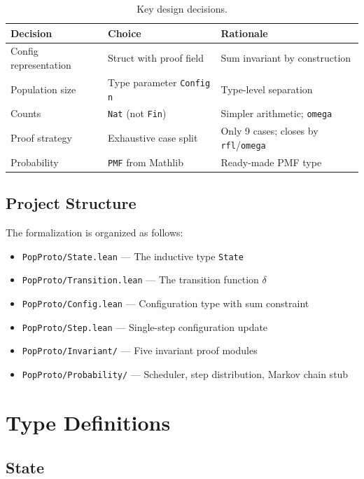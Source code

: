 \documentclass[11pt,a4paper]{article}
\begin{document}
\begin{table}[h]
\centering
\begin{tabular}{lll}
\toprule
\textbf{Decision} & \textbf{Choice} & \textbf{Rationale} \\
\midrule
Config representation & Struct with proof field & Sum invariant by construction \\
Population size & Type parameter \texttt{Config n} & Type-level separation \\
Counts & \texttt{Nat} (not \texttt{Fin}) & Simpler arithmetic; \texttt{omega} \\
Proof strategy & Exhaustive case split & Only 9 cases; closes by \texttt{rfl}/\texttt{omega} \\
Probability & \texttt{PMF} from Mathlib & Ready-made PMF type \\
\bottomrule
\end{tabular}
\caption{Key design decisions.}
\label{tab:decisions}
\end{table}

\subsection{Project Structure}

The formalization is organized as follows:

\begin{itemize}[nosep]
  \item \texttt{PopProto/State.lean} --- The inductive type \texttt{State}
  \item \texttt{PopProto/Transition.lean} --- The transition function $\delta$
  \item \texttt{PopProto/Config.lean} --- Configuration type with sum constraint
  \item \texttt{PopProto/Step.lean} --- Single-step configuration update
  \item \texttt{PopProto/Invariant/} --- Five invariant proof modules
  \item \texttt{PopProto/Probability/} --- Scheduler, step distribution, Markov chain stub
\end{itemize}

\section{Type Definitions}
\label{sec:types}

\subsection{State}
\end{document}
